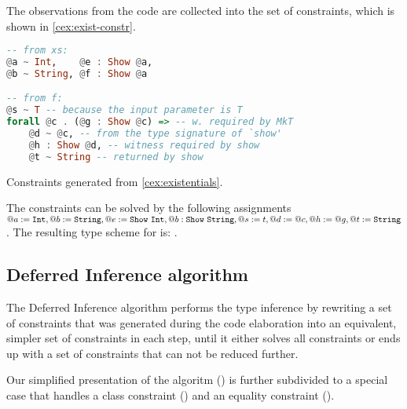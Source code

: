 The observations from the code are collected into the set of constraints, which is shown in \cref{cex:exist-constr}.

\begin{codex}
\begin{lstlisting}[language=Haskell]
-- from xs:
@a ~ Int,    @e : Show @a,
@b ~ String, @f : Show @a

-- from f:
@s ~ T -- because the input parameter is T
forall @c . (@g : Show @c) => -- w. required by MkT
    @d ~ @c, -- from the type signature of `show'
    @h : Show @d, -- witness required by show
    @t ~ String -- returned by show
\end{lstlisting}
\caption{Constraints generated from \cref{cex:existentials}.}
\label{cex:exist-constr}
\end{codex}

The constraints can be solved by the following assignments $@a := \mathtt{Int}, @b := \mathtt{String}, @e := \mathtt{Show}\ \mathtt{Int}, @b : \mathtt{Show}\ \mathtt{String}, @s := t, @d := @c, @h := @g, @t := \mathtt{String}$. The resulting type scheme for  is: .

\FloatBarrier
\subsection{Deferred Inference algorithm}

The Deferred Inference algorithm performs the type inference by rewriting a set of constraints that was generated during the code elaboration into an equivalent, simpler set of constraints in each step, until it either solves all constraints or ends up with a set of constraints that can not be reduced further. \cite{peytonjones2019type}

Our simplified presentation of the algoritm () is further subdivided to a special case that handles a class constraint () and an equality constraint ().

